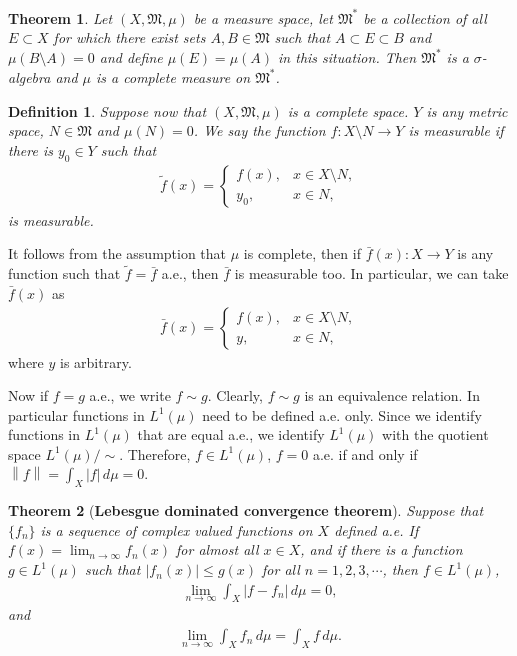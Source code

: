 \documentclass[11pt]{book}
\newtheorem{definition}{Definition}[chapter]
\newtheorem{theorem}{Theorem}[chapter]
\theoremstyle{definition}
\numberwithin{equation}{chapter}
\begin{document}
\medskip

\begin{theorem}{\rm \cite{2}}\label{theorem_218}
Let $(X,\mathfrak{M},\mu)$ be a measure space, let $\mathfrak{M}^*$ be a collection of all $E \subset X$ for which there exist sets $A, B \in \mathfrak{M}$ such that $A \subset E \subset B$ and $\mu(B\setminus A) = 0$ and define $\mu(E) = \mu(A)$ in this situation. Then $\mathfrak{M}^*$ is a $\sigma$-algebra and $\mu$ is a complete measure on $\mathfrak{M}^*$.
\end{theorem}

\medskip

\begin{definition}\label{def_210}
Suppose now that $(X,\mathfrak{M},\mu)$ is a complete space. $Y$ is any metric space, $N \in \mathfrak{M}$ and $\mu(N) = 0$. We say the function $f: X\setminus N \to Y$ is measurable if there is $y_0 \in Y$ such that
\begin{align*}
    \widetilde{f}(x) = \begin{cases}
        f(x), & x \in X \setminus N, \\
        y_0, & x \in N,
    \end{cases}
\end{align*}
is measurable. 
\end{definition}


It follows from the assumption that $\mu$ is complete, then if $\bar{f}(x): X \to Y$ is any function such that $\widetilde{f} = \bar{f}$ a.e., then $\bar{f}$ is measurable too. In particular, we can take $\bar{f}(x)$ as
\begin{align*}
    \bar{f}(x) = \begin{cases}
        f(x), & x \in X \setminus N, \\
        y, & x \in N,
    \end{cases}
\end{align*}
where $y$ is arbitrary.

Now if $f = g$ a.e., we write $f \sim g$. Clearly, $f \sim g$ is an equivalence relation. In particular functions in $L^1(\mu)$ need to be defined a.e. only. Since we identify functions in $L^1(\mu)$ that are equal a.e., we identify $L^1(\mu)$ with the quotient space $L^1(\mu)/\sim$. Therefore, $f \in L^1(\mu)$, $f = 0$ a.e. if and only if $\left\|f\right\| = \int_X|f|\,d\mu = 0$.

\medskip


\begin{theorem}[{\bf Lebesgue dominated convergence theorem}]
Suppose that $\{f_n\}$ is a sequence of complex valued functions on $X$ defined a.e. If $f(x) = \lim_{n\to\infty} f_n(x)$ for almost all $x \in X$, and if there is a function $g \in L^1(\mu)$ such that $\left|f_n(x)\right| \leq g(x)$ for all $n = 1,2,3,\cdots$, then $f \in L^1(\mu)$,
\begin{align*}
    \lim_{n\to\infty} \int_X \left|f - f_n\right|\,d\mu = 0,
\end{align*}
and
\begin{align*}
    \lim_{n\to\infty} \int_X f_n\,d\mu = \int_X f\,d\mu.
\end{align*}
\end{theorem}
\end{document}
